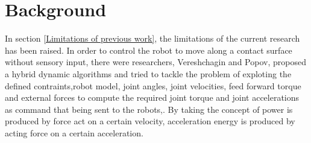 \documentclass[report.tex]{subfiles}
\begin{document}
    \chapter{Background} \label{Background}
    In section \ref{Limitations of previous work}, the limitations of the current research has been raised. In order to control the robot to move along a contact surface without sensory input, there were researchers, Vereshchagin and Popov, proposed a hybrid dynamic algorithms and tried to tackle the problem of exploting the defined contraints,robot model, joint angles, joint velocities, feed forward torque and external forces to compute the required joint torque and joint accelerations as command that being sent to the robots\cite{vereshchagin1989modeling},\cite{vereshchagin1974computer}. By taking the concept of power is produced by force act on a certain velocity, acceleration energy is produced by acting force on a certain acceleration.
\end{document}
